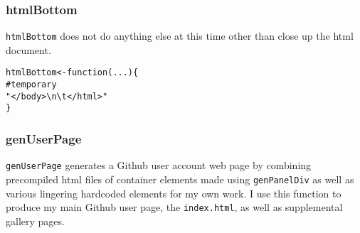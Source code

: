 \documentclass{article}\usepackage[]{graphicx}\usepackage[]{color}
\makeatletter
\newcommand{\hlstr}[1]{\textcolor[rgb]{0.863,0.196,0.184}{#1}}%
\newcommand{\hlcom}[1]{\textcolor[rgb]{0.345,0.431,0.459}{#1}}%
\newcommand{\hlstd}[1]{\textcolor[rgb]{0.514,0.58,0.588}{#1}}%
\newcommand{\hlkwa}[1]{\textcolor[rgb]{0.796,0.294,0.086}{#1}}%
\newcommand{\hlkwb}[1]{\textcolor[rgb]{0.522,0.6,0}{#1}}%
\newcommand{\hlkwc}[1]{\textcolor[rgb]{0.796,0.294,0.086}{#1}}%
\newenvironment{kframe}{%
 \def\at@end@of@kframe{}%
 \ifinner\ifhmode%
  \def\at@end@of@kframe{\end{minipage}}%
  \begin{minipage}{\columnwidth}%
 \fi\fi%
 \def\FrameCommand##1{\hskip\@totalleftmargin \hskip-\fboxsep
 \colorbox{shadecolor}{##1}\hskip-\fboxsep
     \hskip-\linewidth \hskip-\@totalleftmargin \hskip\columnwidth}%
 \MakeFramed {\advance\hsize-\width
   \@totalleftmargin\z@ \linewidth\hsize
   \@setminipage}}%
 {\par\unskip\endMakeFramed%
 \at@end@of@kframe}
\newenvironment{knitrout}{}{} %
\makeatother
\begin{document}
\subsubsection{htmlBottom}

\texttt{htmlBottom} does not do anything else at this time other than close up the html document.


\begin{knitrout}
\color{fgcolor}\begin{kframe}
\begin{alltt}
\hlstd{htmlBottom} \hlkwb{<-} \hlkwa{function}\hlstd{(}\hlkwc{...}\hlstd{) \{}
    \hlcom{# temporary}
    \hlstr{"</body>\textbackslash{}n\textbackslash{}t</html>"}
\hlstd{\}}
\end{alltt}
\end{kframe}
\end{knitrout}

\subsubsection{genUserPage}

\texttt{genUserPage} generates a Github user account web page by combining precompiled html files of container elements made using \texttt{genPanelDiv}
as well as various lingering hardcoded elements for my own work.
I use this function to produce my main Github user page, the \texttt{index.html}, as well as supplemental gallery pages.
\end{document}
